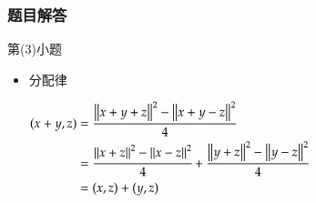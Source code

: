 \documentclass{beamer}
\begin{document}
\begin{frame}[c]
\frametitle{题目解答}
\begin{block}{第(3)小题}
\begin{itemize}
\item 分配律

$\begin{aligned}
	(x+y,z)&=\cfrac{{\left\|x+y+z\right\|}^{2}-{\left\|x+y-z\right\|}^{2}}{4}\\
	&=\cfrac{{\left\|x+z\right\|}^{2}-{\left\|x-z\right\|}^{2}}{4}+\cfrac{{\left\|y+z\right\|}^{2}-{\left\|y-z\right\|}^{2}}{4}\\
	&=(x,z)+(y,z)
\end{aligned}$
\end{itemize}	
\end{block}
\end{frame}
\end{document}
